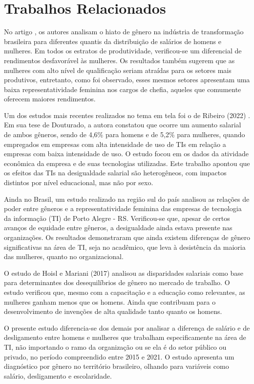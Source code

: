 \section{Trabalhos Relacionados}

No artigo \cite{de2021evidencias}, os autores analisam o hiato de gênero na indústria de transformação brasileira para diferentes quantis da distribuição de salários de homens e mulheres. Em todos os estratos de produtividade, verificou-se um diferencial de rendimentos desfavorável às mulheres.
Os resultados também sugerem que as mulheres com alto nível de
qualificação seriam atraídas para os setores mais produtivos, entretanto, como foi observado, esses mesmos setores apresentam uma baixa representatividade feminina nos cargos de chefia, aqueles que comumente oferecem maiores rendimentos.

Um dos estudos mais recentes realizados no tema em tela foi o de Ribeiro (2022) \cite{ribeiro2022efeitos}. Em sua tese de Douturado, a autora constatou que ocorre um aumento salarial de ambos gêneros,
sendo de 4,6\% para homens e de 5,2\% para mulheres, quando empregados em empresas com
alta intensidade de uso de TIs em relação a empresas com baixa intensidade de uso. O estudo focou em os dados da atividade econômica da empresa e de suas tecnologias utilizadas. Este trabalho apontou que os efeitos das TIs na desigualdade salarial são heterogêneos, com impactos distintos por nível educacional, mas não por sexo. 

Ainda no Brasil, um estudo realizado na região sul do país \cite{camargo2019relaccoes} analisou as relações de poder entre gêneros e a representatividade feminina das empresas de tecnologia da informação (TI) de Porto Alegre - RS. Verificou-se que, apesar de certos avanços de equidade entre gêneros, a desigualdade ainda estava presente nas organizações. Os resultados demonstraram que ainda existem diferenças de gênero significativas na área de TI, seja no acadêmico, que leva à desistência da maioria das mulheres, quanto no organizacional. 

O estudo de Hoisl e Mariani (2017) \cite{hoisl2017sa} analisou as disparidades salariais como base para determinantes dos desequilíbrios de gênero no mercado de trabalho. O estudo verificou que, mesmo com a capacitação e a educação como relevantes, as mulheres ganham menos que os homens. Ainda que contribuam para o desenvolvimento de invenções de alta qualidade tanto quanto os homens.

O presente estudo diferencia-se dos demais por analisar a diferença de salário e de desligamento entre homens e mulheres que trabalham especificamente na área de TI, não importando o ramo da organização ou se ela é do setor público ou privado, no período compreendido entre 2015 e 2021. O estudo apresenta um diagnóstico por gênero no território brasileiro, olhando para variáveis como salário, desligamento e escolaridade.
